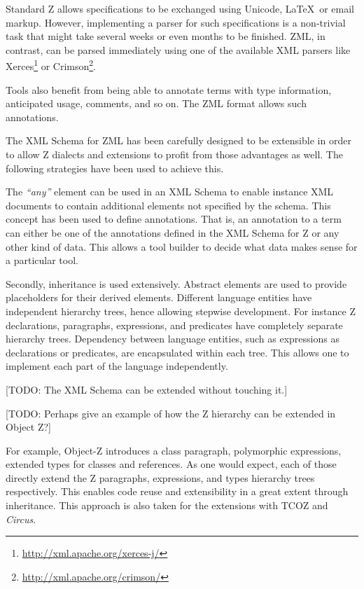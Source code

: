 \documentclass{llncs}
\newcommand{\Circus}{{\sf\slshape Circus}}
\begin{document}
  Standard Z allows specifications to be exchanged using Unicode,
  \LaTeX\ or email markup.  However, implementing a parser for such
  specifications is a non-trivial task that might take several weeks
  or even months to be finished.  ZML, in contrast, can be parsed
  immediately using one of the available XML parsers like
  Xerces\footnote{\url{http://xml.apache.org/xerces-j/}} or
  Crimson\footnote{\url{http://xml.apache.org/crimson/}}.

  Tools also benefit from being able to annotate terms with type
  information, anticipated usage, comments, and so on.  The ZML format
  allows such annotations.

  The XML Schema for ZML has been carefully designed to be extensible
  in order to allow Z dialects and extensions to profit from those
  advantages as well.  The following strategies have been used to
  achieve this.

  The \textit{``any''} element can be used in an XML Schema to enable
  instance XML documents to contain additional elements not specified by the
  schema.  This concept has been used to define annotations.  That is,
  an annotation to a term can either be one of the annotations defined
  in the XML Schema for Z or any other kind of data.  This allows a
  tool builder to decide what data makes sense for a particular tool.

  Secondly, inheritance is used extensively.  Abstract elements are
  used to provide placeholders for their derived elements.
  Different language entities have independent hierarchy trees,
  hence allowing stepwise development.
  For instance Z declarations, paragraphs, expressions, and predicates
  have completely separate hierarchy trees.
  Dependency between language entities, such as expressions as declarations
  or predicates, are encapsulated within each tree.
  This allows one to implement each part of the language independently.

  [TODO: The XML Schema can be extended without touching it.]

  [TODO: Perhaps give an example of how the Z hierarchy can be
  extended in Object Z?]

  For example, Object-Z introduces a class paragraph, polymorphic expressions,
  extended types for classes and references. As one would expect, each of those
  directly extend the Z paragraphs, expressions, and types hierarchy trees
  respectively. This enables code reuse and extensibility in a great extent
  through inheritance. This approach is also taken for the extensions with
  TCOZ and \Circus.
\end{document}
